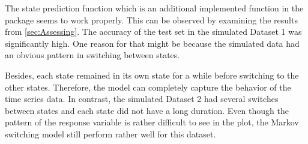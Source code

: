 The state prediction function which is an additional implemented function
in the package seems to work properly. This can be observed by examining
the results from \ref{sec:Assessing}. The accuracy of the test set
in the simulated Dataset 1 was significantly high. One reason for
that might be because the simulated data had an obvious pattern in
switching between states. %
\begin{comment}
For example, the value of the CPU usage is moderately low if it is
generated from the Good state.
\end{comment}
Besides, each state remained in its own state for a while before switching
to the other states. Therefore, the model can completely capture the
behavior of the time series data. In contrast, the simulated Dataset
2 had several switches between states and each state did not have
a long duration. Even though the pattern of the response variable
is rather difficult to see in the plot, the Markov switching model
still perform rather well for this dataset.



